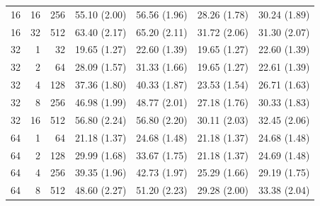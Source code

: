 \documentclass[11pt,letterpaper]{article}
\begin{document}
\begin{table}[p]
\begin{tabular}{@{}rrr rrrr@{}}
16 & 16 & 256 & 55.10 {\scriptsize (2.00)} & 56.56 {\scriptsize (1.96)} & 28.26 {\scriptsize (1.78)} & 30.24 {\scriptsize (1.89)} \\
16 & 32 & 512 & 63.40 {\scriptsize (2.17)} & 65.20 {\scriptsize (2.11)} & 31.72 {\scriptsize (2.06)} & 31.30 {\scriptsize (2.07)} \\
\midrule
32 & 1 & 32 & 19.65 {\scriptsize (1.27)} & 22.60 {\scriptsize (1.39)} & 19.65 {\scriptsize (1.27)} & 22.60 {\scriptsize (1.39)} \\
32 & 2 & 64 & 28.09 {\scriptsize (1.57)} & 31.33 {\scriptsize (1.66)} & 19.65 {\scriptsize (1.27)} & 22.61 {\scriptsize (1.39)} \\
32 & 4 & 128 & 37.36 {\scriptsize (1.80)} & 40.33 {\scriptsize (1.87)} & 23.53 {\scriptsize (1.54)} & 26.71 {\scriptsize (1.63)} \\
32 & 8 & 256 & 46.98 {\scriptsize (1.99)} & 48.77 {\scriptsize (2.01)} & 27.18 {\scriptsize (1.76)} & 30.33 {\scriptsize (1.83)} \\
32 & 16 & 512 & 56.80 {\scriptsize (2.24)} & 56.80 {\scriptsize (2.20)} & 30.11 {\scriptsize (2.03)} & 32.45 {\scriptsize (2.06)} \\
\midrule
64 & 1 & 64 & 21.18 {\scriptsize (1.37)} & 24.68 {\scriptsize (1.48)} & 21.18 {\scriptsize (1.37)} & 24.68 {\scriptsize (1.48)} \\
64 & 2 & 128 & 29.99 {\scriptsize (1.68)} & 33.67 {\scriptsize (1.75)} & 21.18 {\scriptsize (1.37)} & 24.69 {\scriptsize (1.48)} \\
64 & 4 & 256 & 39.35 {\scriptsize (1.96)} & 42.73 {\scriptsize (1.97)} & 25.29 {\scriptsize (1.66)} & 29.19 {\scriptsize (1.75)} \\
64 & 8 & 512 & 48.60 {\scriptsize (2.27)} & 51.20 {\scriptsize (2.23)} & 29.28 {\scriptsize (2.00)} & 33.38 {\scriptsize (2.04)} \\
\bottomrule
\end{tabular}
\end{table}
\end{document}
